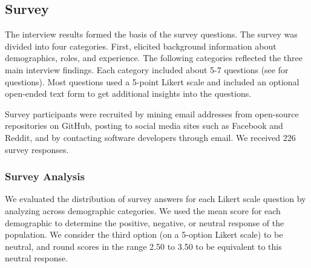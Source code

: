 
\subsection{Survey}

The interview results formed the basis of the survey questions. The survey was divided into four categories. First, elicited background information about demographics, roles, and experience. The following categories reflected the three main interview findings. Each category included about 5-7 questions (see \cite{companion_site} for questions). Most questions used a 5-point Likert scale and included an optional open-ended text form to get additional insights into the questions. 

Survey participants were recruited by mining email addresses from open-source repositories on GitHub, posting to social media sites such as Facebook and Reddit, and by contacting software developers through email. We received 226 survey responses.

\subsubsection{Survey Analysis}
We evaluated the distribution of survey answers for each Likert scale question by analyzing across demographic categories. 
We used the mean score for each demographic to determine the positive, negative, or neutral response of the population. 
We consider the third option (on a 5-option Likert scale) to be neutral, and round scores in the range 2.50 to 3.50 to be equivalent to this neutral response.
